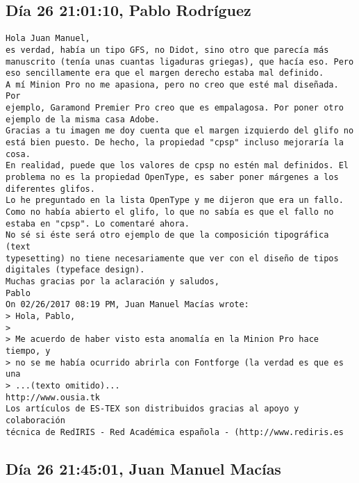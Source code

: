 \documentclass[a4paper,10pt]{article}
\begin{document}
\subsection{Día 26 21:01:10, Pablo Rodríguez}

\begin{lstlisting}
Hola Juan Manuel,
es verdad, había un tipo GFS, no Didot, sino otro que parecía más
manuscrito (tenía unas cuantas ligaduras griegas), que hacía eso. Pero
eso sencillamente era que el margen derecho estaba mal definido.
A mí Minion Pro no me apasiona, pero no creo que esté mal diseñada. Por
ejemplo, Garamond Premier Pro creo que es empalagosa. Por poner otro
ejemplo de la misma casa Adobe.
Gracias a tu imagen me doy cuenta que el margen izquierdo del glifo no
está bien puesto. De hecho, la propiedad "cpsp" incluso mejoraría la cosa.
En realidad, puede que los valores de cpsp no estén mal definidos. El
problema no es la propiedad OpenType, es saber poner márgenes a los
diferentes glifos.
Lo he preguntado en la lista OpenType y me dijeron que era un fallo.
Como no había abierto el glifo, lo que no sabía es que el fallo no
estaba en "cpsp". Lo comentaré ahora.
No sé si éste será otro ejemplo de que la composición tipográfica (text
typesetting) no tiene necesariamente que ver con el diseño de tipos
digitales (typeface design).
Muchas gracias por la aclaración y saludos,
Pablo
On 02/26/2017 08:19 PM, Juan Manuel Macías wrote:
> Hola, Pablo,
> 
> Me acuerdo de haber visto esta anomalía en la Minion Pro hace tiempo, y
> no se me había ocurrido abrirla con Fontforge (la verdad es que es una
> ...(texto omitido)...
http://www.ousia.tk
Los artículos de ES-TEX son distribuidos gracias al apoyo y colaboración 
técnica de RedIRIS - Red Académica española - (http://www.rediris.es

\end{lstlisting}

\subsection{Día 26 21:45:01, Juan Manuel Macías}
\end{document}
